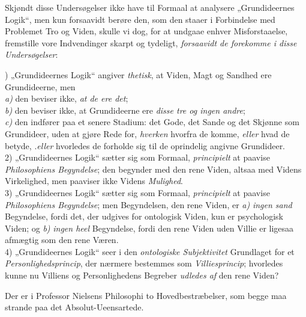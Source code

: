 \documentclass[12pt,a4paper]{book}
\newcommand{\opage}[1]{\marginnote{\footnotesize\textit{[#1]}}}
\begin{document}
Skjøndt disse Undersøgelser ikke have til Formaal
at analysere „Grundideernes Logik“, men kun forsaavidt
berøre den, som den staaer i Forbindelse med Problemet
Tro og Viden, skulle vi dog, for at undgaae
enhver Misforstaaelse, fremstille vore Indvendinger skarpt
og tydeligt, \emph{forsaavidt de forekomme i disse Undersøgelser}:
\par{}) „Grundideernes Logik“ angiver \emph{thetisk}, at Viden,
Magt og Sandhed ere Grundideerne, men\\
\textit{a)} den beviser ikke, \emph{at de ere det};\\
\textit{b)} den beviser ikke, at Grundideerne ere \emph{disse tre
og ingen andre};\\
\textit{c)} den indfører paa et senere Stadium: det Gode,
det Sande og det Skjønne som Grundideer,
uden at gjøre Rede for, \emph{hverken} hvorfra de
komme, \emph{eller} hvad de betyde, .\emph{eller} hvorledes
de forholde sig til de oprindelig angivne Grundideer.\\
2) „Grundideernes Logik“ sætter sig som Formaal,
\emph{principielt} at paavise \emph{Philosophiens Begyndelse}; den begynder med den rene Viden,
altsaa med Videns Virkelighed, men paaviser ikke
Videns \emph{Mulighed}.\\
3) „Grundideernes Logik“ sætter sig som Formaal,
\emph{principielt} at paavise \emph{Philosophiens Begyndelse}; men Begyndelsen, den rene Viden,
\opage{70}\setcounter{footnote}{0}er \textit{a)} \emph{ingen sand} Begyndelse, fordi det, der
udgives for ontologisk Viden, kun er psychologisk
Viden; og \textit{b)} \emph{ingen heel} Begyndelse, fordi den
rene Viden uden Villie er ligesaa afmægtig som
den rene Væren.\\
4) „Grundideernes Logik“ seer i den \emph{ontologiske
Subjektivitet} Grundlaget for et \emph{Personlighedsprincip}, der nærmere bestemmes som \emph{Villiesprincip}; hvorledes kunne nu Villiens og
Personlighedens Begreber \emph{udledes af} den rene
Viden?

Der er i Professor Nielsens Philosophi to Hovedbestræbelser,
som begge maa strande paa det Absolut-Ueensartede.
\end{document}

